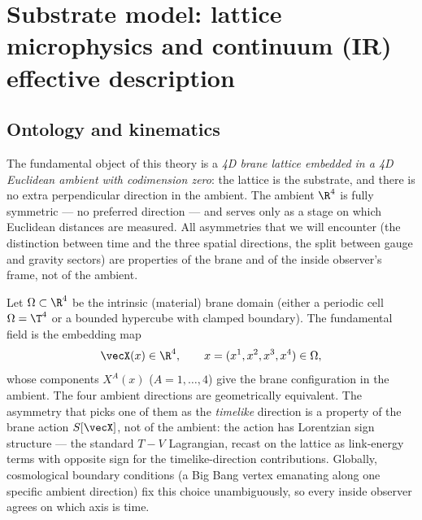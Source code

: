 \section{Substrate model: lattice microphysics and continuum (IR) effective description}
\label{sec:continuum-model}

\subsection{Ontology and kinematics}
\label{subsec:ontology-kinematics}

The fundamental object of this theory is a \emph{4D brane lattice embedded in a 4D Euclidean ambient with codimension zero}: the lattice is the substrate, and there is no extra perpendicular direction in the ambient.
The ambient $\R^4$ is fully symmetric --- no preferred direction --- and serves only as a stage on which Euclidean distances are measured.
All asymmetries that we will encounter (the distinction between time and the three spatial directions, the split between gauge and gravity sectors) are properties of the brane and of the inside observer's frame, not of the ambient.

Let $\Omega\subset\R^4$ be the intrinsic (material) brane domain (either a periodic cell $\Omega=\T^4$ or a bounded hypercube with clamped boundary).
The fundamental field is the embedding map
\begin{equation}
  \vecX(x)\in\R^4,
  \qquad x=(x^1,x^2,x^3,x^4)\in\Omega,
  \label{eq:fundamental-field}
\end{equation}
whose components $X^A(x)$ ($A=1,\dots,4$) give the brane configuration in the ambient.
The four ambient directions are geometrically equivalent.
The asymmetry that picks one of them as the \emph{timelike} direction is a property of the brane action $S[\vecX]$, not of the ambient: the action has Lorentzian sign structure --- the standard $T-V$ Lagrangian, recast on the lattice as link-energy terms with opposite sign for the timelike-direction contributions.
Globally, cosmological boundary conditions (a Big Bang vertex emanating along one specific ambient direction) fix this choice unambiguously, so every inside observer agrees on which axis is time.

